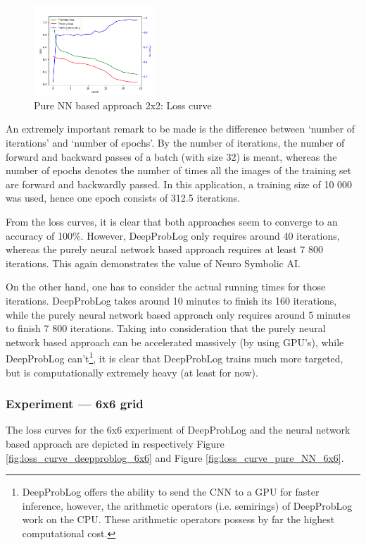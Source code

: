 \documentclass[english]{sobraep}
\begin{document}
\begin{figure}[htp]
    \begin{center}
    \includegraphics[width=0.40\textwidth]{loss_curve_pure_NN_2x2.png} 
    \captionsetup{justification=centering}
    \caption{Pure NN based approach 2x2: Loss curve}
    \label{fig:loss_curve_pure_NN_2x2}
    \end{center}
\end{figure}
An extremely important remark to be made is the difference between `number of iterations' and `number of epochs'. By the number of iterations, the number of forward and backward passes of a batch (with size 32) is meant, whereas the number of epochs denotes the number of times all the images of the training set are forward and backwardly passed. In this application, a training size of 10 000 was used, hence one epoch consists of 312.5 iterations.

From the loss curves, it is clear that both approaches seem to converge to an accuracy of 100\%. However, DeepProbLog only requires around 40 iterations, whereas the purely neural network based approach requires at least 7 800 iterations. This again demonstrates the value of Neuro Symbolic AI.

On the other hand, one has to consider the actual running times for those iterations. DeepProbLog takes around 10 minutes to finish its 160 iterations, while the purely neural network based approach only requires around 5 minutes to finish 7 800 iterations. Taking into consideration that the purely neural network based approach can be accelerated massively (by using GPU's), while DeepProbLog can't\footnote{DeepProbLog offers the ability to send the CNN to a GPU for faster inference, however, the arithmetic operators (i.e. semirings) of DeepProbLog work on the CPU. These arithmetic operators possess by far the highest computational cost.}, it is clear that DeepProbLog trains much more targeted, but is computationally extremely heavy (at least for now).

\subsubsection{Experiment --- 6x6 grid}
The loss curves for the 6x6 experiment of DeepProbLog and the neural network based approach are depicted in respectively Figure \ref{fig:loss_curve_deepproblog_6x6} and Figure \ref{fig:loss_curve_pure_NN_6x6}.
\end{document}
